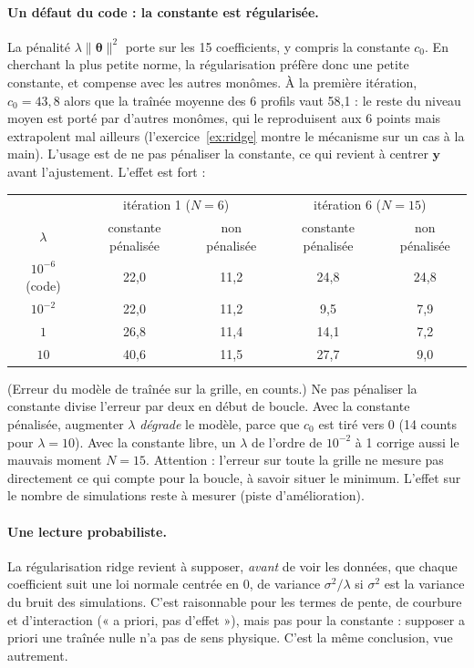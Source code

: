 \paragraph{Un défaut du code : la constante est régularisée.} La pénalité $\lambda\|\boldsymbol\theta\|^2$ porte sur les 15 coefficients, y compris la constante $c_0$. En cherchant la plus petite norme, la régularisation préfère donc une petite constante, et compense avec les autres monômes. À la première itération, $c_0=43{,}8$ alors que la traînée moyenne des 6 profils vaut 58,1 : le reste du niveau moyen est porté par d'autres monômes, qui le reproduisent aux 6 points mais extrapolent mal ailleurs (l'exercice~\ref{ex:ridge} montre le mécanisme sur un cas à la main). L'usage est de ne pas pénaliser la constante, ce qui revient à centrer $\mathbf y$ avant l'ajustement. L'effet est fort :
\begin{center}
\renewcommand{\arraystretch}{1.2}
\small
\begin{tabular}{ccccc}
\toprule
& \multicolumn{2}{c}{itération 1 ($N=6$)} & \multicolumn{2}{c}{itération 6 ($N=15$)} \\
$\lambda$ & constante pénalisée & non pénalisée & constante pénalisée & non pénalisée \\
\midrule
$10^{-6}$ (code) & 22,0 & 11,2 & 24,8 & 24,8 \\
$10^{-2}$ & 22,0 & 11,2 & 9,5 & 7,9 \\
$1$ & 26,8 & 11,4 & 14,1 & 7,2 \\
$10$ & 40,6 & 11,5 & 27,7 & 9,0 \\
\bottomrule
\end{tabular}
\end{center}
(Erreur du modèle de traînée sur la grille, en counts.) Ne pas pénaliser la constante divise l'erreur par deux en début de boucle. Avec la constante pénalisée, augmenter $\lambda$ \emph{dégrade} le modèle, parce que $c_0$ est tiré vers 0 (14 counts pour $\lambda=10$). Avec la constante libre, un $\lambda$ de l'ordre de $10^{-2}$ à 1 corrige aussi le mauvais moment $N=15$. Attention : l'erreur sur toute la grille ne mesure pas directement ce qui compte pour la boucle, à savoir situer le minimum. L'effet sur le nombre de simulations reste à mesurer (piste d'amélioration).

\paragraph{Une lecture probabiliste.} La régularisation ridge revient à supposer, \emph{avant} de voir les données, que chaque coefficient suit une loi normale centrée en 0, de variance $\sigma^2/\lambda$ si $\sigma^2$ est la variance du bruit des simulations. C'est raisonnable pour les termes de pente, de courbure et d'interaction (« a priori, pas d'effet »), mais pas pour la constante : supposer a priori une traînée nulle n'a pas de sens physique. C'est la même conclusion, vue autrement.

